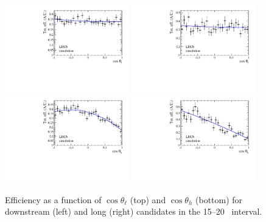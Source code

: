 \begin{figure}[h]
\centering
\includegraphics[width=0.48\textwidth]{Lmumu/figs/efficiencies/angular/DDeffFit_q2_1500_2000.pdf}
\includegraphics[width=0.48\textwidth]{Lmumu/figs/efficiencies/angular/LLeffFit_q2_1500_2000.pdf}
\includegraphics[width=0.48\textwidth]{Lmumu/figs/efficiencies/angular/DDeffFitB_q2_1500_2000.pdf}
\includegraphics[width=0.48\textwidth]{Lmumu/figs/efficiencies/angular/LLeffFitB_q2_1500_2000.pdf}
\caption{Efficiency as a function of $\cos\theta_\ell$ (top) and $\cos\theta_h$ (bottom) for
downstream (left) and long (right) candidates in the 15--20 \gevgevcccc ~\qsq interval.  }
\label{fig:angular_eff}
\end{figure}
%
